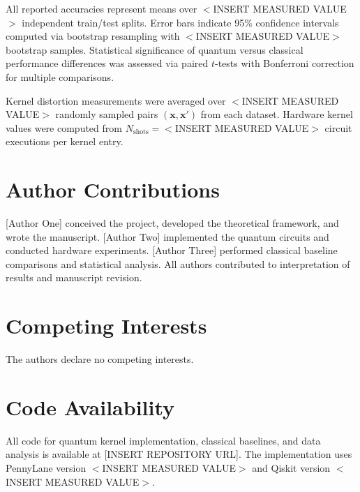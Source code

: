\documentclass[aps,prb,reprint,superscriptaddress,showpacs]{revtex4-2}
\begin{document}
All reported accuracies represent means over $<$INSERT MEASURED VALUE$>$ independent train/test splits. Error bars indicate 95\% confidence intervals computed via bootstrap resampling with $<$INSERT MEASURED VALUE$>$ bootstrap samples. Statistical significance of quantum versus classical performance differences was assessed via paired $t$-tests with Bonferroni correction for multiple comparisons.

Kernel distortion measurements were averaged over $<$INSERT MEASURED VALUE$>$ randomly sampled pairs $(\mathbf{x}, \mathbf{x}')$ from each dataset. Hardware kernel values were computed from $N_{\text{shots}} = <$INSERT MEASURED VALUE$>$ circuit executions per kernel entry.


\section*{Author Contributions}

[Author One] conceived the project, developed the theoretical framework, and wrote the manuscript. [Author Two] implemented the quantum circuits and conducted hardware experiments. [Author Three] performed classical baseline comparisons and statistical analysis. All authors contributed to interpretation of results and manuscript revision.


\section*{Competing Interests}

The authors declare no competing interests.


\section*{Code Availability}

All code for quantum kernel implementation, classical baselines, and data analysis is available at [INSERT REPOSITORY URL]. The implementation uses PennyLane version $<$INSERT MEASURED VALUE$>$ and Qiskit version $<$INSERT MEASURED VALUE$>$.
\end{document}
